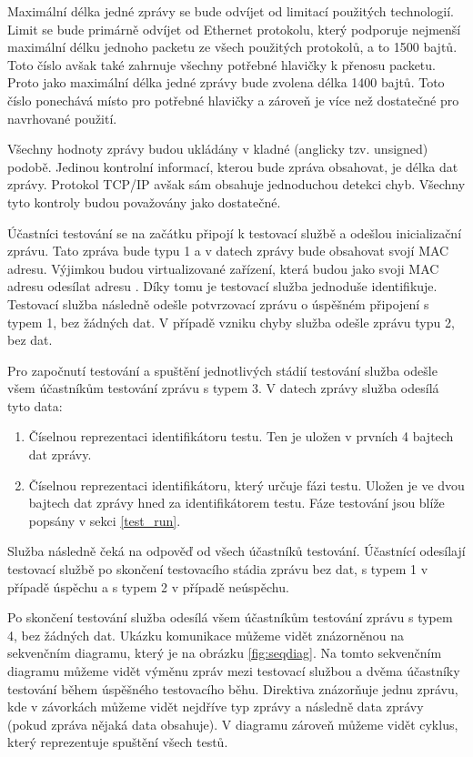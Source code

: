 Maximální délka jedné zprávy se bude odvíjet od limitací použitých technologií. Limit se bude primárně odvíjet od Ethernet protokolu, který podporuje nejmenší maximální délku jednoho packetu ze všech použitých protokolů, a to 1500 bajtů. Toto číslo avšak také zahrnuje všechny potřebné hlavičky k přenosu packetu. Proto jako maximální délka jedné zprávy bude zvolena délka 1400 bajtů. Toto číslo ponechává místo pro potřebné hlavičky a zároveň je více než dostatečné pro navrhované použití. \cite{max_packet_size} 

Všechny hodnoty zprávy budou ukládány v kladné (anglicky tzv. unsigned) podobě. Jedinou kontrolní informací, kterou bude zpráva obsahovat, je délka dat zprávy. Protokol TCP/IP avšak sám obsahuje jednoduchou detekci chyb. Všechny tyto kontroly budou považovány jako dostatečné.

Účastníci testování se na začátku připojí k testovací službě a odešlou inicializační zprávu. Tato zpráva bude typu 1 a v datech zprávy bude obsahovat svojí MAC adresu. Výjimkou budou virtualizované zařízení, která budou jako svoji MAC adresu odesílat adresu . Díky tomu je testovací služba jednoduše identifikuje. Testovací služba následně odešle potvrzovací zprávu o úspěšném připojení s typem 1, bez žádných dat. V případě vzniku chyby služba odešle zprávu typu 2, bez dat. 

Pro započnutí testování a spuštění jednotlivých stádií testování služba odešle všem účastníkům testování zprávu s typem 3. V datech zprávy služba odesílá tyto data:

\begin{enumerate}
    \item Číselnou reprezentaci identifikátoru testu. Ten je uložen v prvních 4 bajtech dat zprávy.
    \item Číselnou reprezentaci identifikátoru, který určuje fázi testu. Uložen je ve dvou bajtech dat zprávy hned za identifikátorem testu. Fáze testování jsou blíže popsány v sekci \ref{test_run}.
\end{enumerate}

Služba následně čeká na odpověď od všech účastníků testování. Účastnící odesílají testovací službě po skončení testovacího stádia zprávu bez dat, s typem 1 v případě úspěchu a s typem 2 v případě neúspěchu. 

Po skončení testování služba odesílá všem účastníkům testování zprávu s typem 4, bez žádných dat. Ukázku komunikace můžeme vidět znázorněnou na sekvenčním diagramu, který je na obrázku \ref{fig:seqdiag}. Na tomto sekvenčním diagramu můžeme vidět výměnu zpráv mezi testovací službou a dvěma účastníky testování během úspěšného testovacího běhu. Direktiva  znázorňuje jednu zprávu, kde v závorkách můžeme vidět nejdříve typ zprávy a následně data zprávy (pokud zpráva nějaká data obsahuje). V diagramu zároveň můžeme vidět cyklus, který reprezentuje spuštění všech testů.

